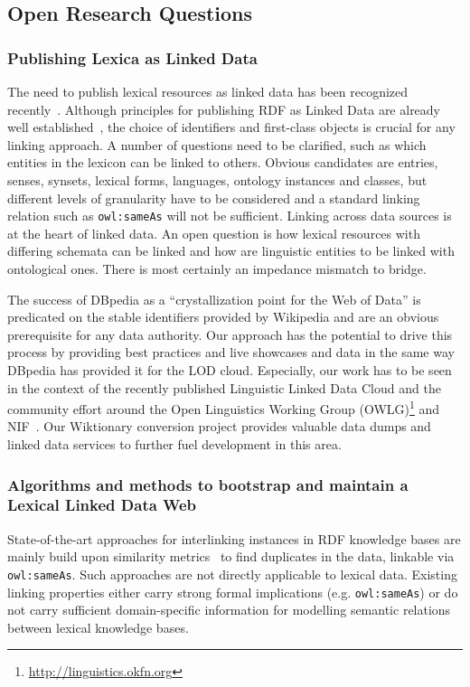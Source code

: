 \subsection{Open Research Questions}
\subsubsection{Publishing Lexica as Linked Data}
The need to publish lexical resources as linked data has been recognized recently~\cite{NuzzoleseEtAl_KCAP2011}.
Although principles for publishing RDF as Linked Data are already well established~\cite{auer-swj-2010,linkeddata-book}, the choice of identifiers and first-class objects is crucial for any linking approach.
A number of questions need to be clarified, such as which entities in the lexicon can be linked to others. 
Obvious candidates are entries, senses, synsets, lexical forms, languages, ontology instances and classes, but different levels of granularity have to be considered and a standard linking relation such as \texttt{owl:sameAs} will not be sufficient. 
Linking across data sources is at the heart of linked data. 
An open question is how lexical resources with differing schemata can be linked and how are linguistic entities to be linked with ontological ones. 
There is most certainly an impedance mismatch to bridge.

The success of DBpedia as a ``crystallization point for the Web of Data'' is predicated on the stable identifiers provided by Wikipedia and are an obvious prerequisite for any data authority.
Our approach has the potential to drive this process by providing best practices and live showcases and data in the same way DBpedia has provided it for the LOD cloud. 
Especially, our work has to be seen in the context of the recently published Linguistic Linked Data Cloud\cite{CHIARCOS12.912} and the community effort around the Open Linguistics Working Group (OWLG)\footnote{\url{http://linguistics.okfn.org}} and NIF~\cite{hellmann-2012-ekaw}.
Our Wiktionary conversion project provides valuable data dumps and linked data services to further fuel development in this area.  


\subsubsection{Algorithms and methods to bootstrap and maintain a Lexical Linked Data Web}

State-of-the-art approaches for interlinking instances in RDF knowledge bases are mainly build upon similarity metrics~\cite{NGAU11,conf/semweb/VolzBGK09} to find duplicates in the data, linkable via \texttt{owl:sameAs}.
Such approaches are not directly applicable to lexical data.
Existing linking properties either carry strong formal implications (e.g. \texttt{owl:sameAs}) or do not carry sufficient domain-specific information for modelling semantic relations between lexical knowledge bases.

\newpage
